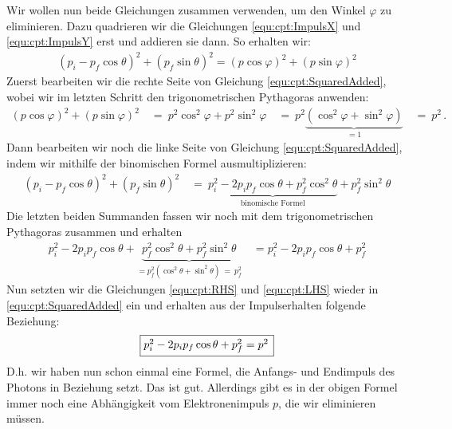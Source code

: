 \documentclass[a4paper, 10pt]{scrbook}
\begin{document}
Wir wollen nun beide Gleichungen zusammen verwenden, um den Winkel $\varphi$ zu eliminieren.
Dazu quadrieren wir die Gleichungen \eqref{equ:cpt:ImpulsX} und \eqref{equ:cpt:ImpulsY} erst und addieren sie dann.
So erhalten wir:
\begin{align}
 \left( p_i - p_f \cos\theta\right)^2 + \left( p_f \sin\theta \right)^2 = \left( p\cos\varphi \right)^2 + \left( p\sin\varphi \right)^2
 \label{equ:cpt:SquaredAdded}
\end{align}
Zuerst bearbeiten wir die rechte Seite von Gleichung \eqref{equ:cpt:SquaredAdded}, wobei wir im letzten Schritt den trigonometrischen Pythagoras anwenden:
\begin{align}
 \left( p\cos\varphi \right)^2 + \left( p\sin\varphi \right)^2 \quad=~ p^2 \cos^2\varphi + p^2 \sin^2\varphi
 \quad=~ p^2 \underbrace{\left( \cos^2\varphi + \sin^2\varphi \right)}_{=1} \quad=~ p^2\, .
 \label{equ:cpt:RHS}
\end{align}
Dann bearbeiten wir noch die linke Seite von Gleichung \eqref{equ:cpt:SquaredAdded}, indem wir mithilfe der binomischen Formel ausmultiplizieren:
\begin{align*}
 \left( p_i - p_f \cos\theta\right)^2 + \left( p_f \sin\theta \right)^2
 \quad=~ \underbrace{p_i^2 - 2p_i p_f \cos\theta + p_f^2 \cos^2\theta}_{\text{binomische Formel}} + p_f^2 \sin^2 \theta
\end{align*}
Die letzten beiden Summanden fassen wir noch mit dem trigonometrischen Pythagoras zusammen und erhalten
\begin{align}
 p_i^2 - 2p_i p_f \cos\theta + \underbrace{p_f^2 \cos^2\theta + p_f^2 \sin^2 \theta}_{=p_f^2 \left(\cos^2\theta + \sin^2 \theta\right) ~=~ p_f^2}
 \quad= p_i^2 - 2p_i p_f \cos\theta + p_f^2
 \label{equ:cpt:LHS}
\end{align}
Nun setzten wir die Gleichungen \eqref{equ:cpt:RHS} und \eqref{equ:cpt:LHS} wieder in \eqref{equ:cpt:SquaredAdded} ein und erhalten aus der Impulserhalten folgende Beziehung:
\begin{align}
 \fbox{\parbox{4cm}{$p_i^2 - 2p_i p_f \cos\theta + p_f^2 = p^2$}}
 \label{equ:cpt:Impulserhaltung}
\end{align}
D.h. wir haben nun schon einmal eine Formel, die Anfangs- und Endimpuls des Photons in Beziehung setzt.
Das ist gut.
Allerdings gibt es in der obigen Formel immer noch eine Abhängigkeit vom Elektronenimpuls $p$, die wir eliminieren müssen.
\end{document}
